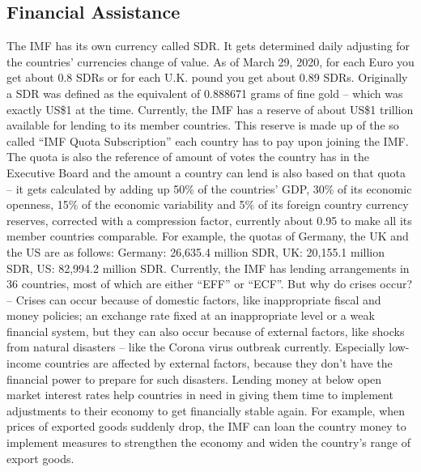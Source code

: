 \subsection{Financial Assistance}
The \gls{IMF} has its own currency called \gls{SDR}. It gets determined daily adjusting for the countries’ currencies change of value. As of March 29, 2020, for each Euro you get about 0.8 \gls{SDR}s or for each U.K. pound you get about 0.89 \gls{SDR}s.\cite{InternationalMonetaryFundSDRsper2020} Originally a \gls{SDR} was defined as the equivalent of 0.888671 grams of fine gold – which was exactly US\$1 at the time.\cite{InternationalMonetaryFundSpecialDrawing2020} Currently, the \gls{IMF} has a reserve of about US\$1 trillion available for lending to its member countries.\cite{InternationalMonetaryFundTheIMF2019} This reserve is made up of the so called \enquote{IMF Quota Subscription} each country has to pay upon joining the \gls{IMF}. The quota is also the reference of amount of votes the country has in the Executive Board and the amount a country can lend is also based on that quota – it gets calculated by adding up 50\% of the countries’ GDP, 30\% of its economic openness, 15\% of the economic variability and 5\% of its foreign country currency reserves, corrected with a compression factor, currently about 0.95 to make all its member countries comparable. For example, the quotas of Germany, the UK and the US are as follows: Germany: 26,635.4 million \gls{SDR}, UK: 20,155.1 million \gls{SDR}, US: 82,994.2 million \gls{SDR}.\cite{InternationalMonetaryFundIMFMembers2020} Currently, the \gls{IMF} has lending arrangements in 36 countries, most of which are either \enquote{\gls{EFF}} or \enquote{\gls{ECF}}.\cite{InternationalMonetaryFundIMFLending2020b} 
But why do crises occur? – Crises can occur because of domestic factors, like inappropriate fiscal and money policies; an exchange rate fixed at an inappropriate level or a weak financial system, but they can also occur because of external factors, like shocks from natural disasters – like the Corona virus outbreak currently. Especially low-income countries are affected by external factors, because they don’t have the financial power to prepare for such disasters. Lending money at below open market interest rates help countries in need in giving them time to implement adjustments to their economy to get financially stable again. For example, when prices of exported goods suddenly drop, the \gls{IMF} can loan the country money to implement measures to strengthen the economy and widen the country’s range of export goods. 
